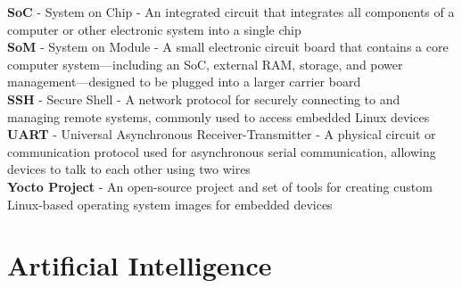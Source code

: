 \begin{singlespace}
\textbf{SoC} - System on Chip - An integrated circuit that integrates all
components of a computer or other electronic system into a single chip  \\

\textbf{SoM} - System on Module - A small electronic circuit board that
contains a core computer system—including an SoC, external RAM, storage,
and power management—designed to be plugged into a larger carrier board  \\

\textbf{SSH} - Secure Shell - A network protocol for securely connecting to
and managing remote systems, commonly used to access embedded Linux
devices  \\

\textbf{UART} - Universal Asynchronous Receiver-Transmitter - A physical
circuit or communication protocol used for asynchronous serial
communication, allowing devices to talk to each other using two wires  \\

\textbf{Yocto Project} - An open-source project and set of tools for
creating custom Linux-based operating system images for embedded devices  \\

\end{singlespace}
\endgroup

\section{Artificial Intelligence}\label{artificial-intelligence}

